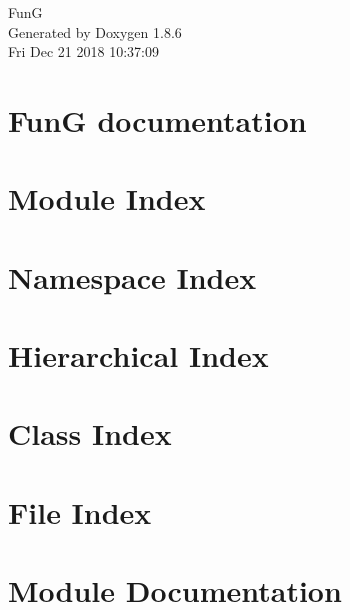 \documentclass[twoside]{book}
\newcommand{\clearemptydoublepage}{%
  \newpage{\pagestyle{empty}\cleardoublepage}%
}
\begin{document}
\hypersetup{pageanchor=false}
\begin{titlepage}
\vspace*{7cm}
\begin{center}%
{\Large Fun\-G }\\
\vspace*{1cm}
{\large Generated by Doxygen 1.8.6}\\
\vspace*{0.5cm}
{\small Fri Dec 21 2018 10:37:09}\\
\end{center}
\end{titlepage}
\clearemptydoublepage
\tableofcontents
\clearemptydoublepage
{}
\hypersetup{pageanchor=true}

\chapter{Fun\-G documentation}
\label{index}\hypertarget{index}{}
\chapter{Module Index}

\chapter{Namespace Index}

\chapter{Hierarchical Index}

\chapter{Class Index}

\chapter{File Index}

\chapter{Module Documentation}











\end{document}
